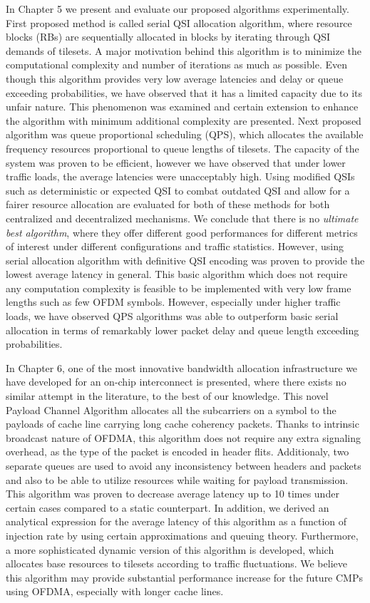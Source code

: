 In Chapter 5 we present and evaluate our proposed algorithms experimentally. First proposed method is called serial QSI allocation algorithm, where resource blocks (RBs) are sequentially allocated in blocks by iterating through QSI demands of tilesets. A major motivation behind this algorithm is to minimize the computational complexity and number of iterations as much as possible. Even though this algorithm provides very low average latencies and delay or queue exceeding probabilities, we have observed that it has a limited capacity due to its unfair nature. This phenomenon was examined and certain extension to enhance the algorithm with minimum additional complexity are presented. Next proposed algorithm was queue proportional scheduling (QPS), which allocates the available frequency resources proportional to queue lengths of tilesets. The capacity of the system was proven to be efficient, however we have observed that under lower traffic loads, the average latencies were unacceptably high. Using modified QSIs such as deterministic or expected QSI to combat outdated QSI and allow for a fairer resource allocation are evaluated for both of these methods for both centralized and decentralized mechanisms. We conclude that there is no \textit{ultimate best algorithm}, where they offer different good performances for different metrics of interest under different configurations and traffic statistics. However, using serial allocation algorithm with definitive QSI encoding was proven to provide the lowest average latency in general. This basic algorithm which does not require any computation complexity is feasible to be implemented with very low frame lengths such as few OFDM symbols. However, especially under higher traffic loads, we have observed QPS algorithms was able to outperform basic serial allocation in terms of remarkably lower packet delay and queue length exceeding probabilities. 
 
In Chapter 6, one of the most innovative bandwidth allocation infrastructure we have developed for an on-chip interconnect is presented, where there exists no similar attempt in the literature, to the best of our knowledge. This novel Payload Channel Algorithm allocates all the subcarriers on a symbol to the payloads of cache line carrying long cache coherency packets. Thanks to intrinsic broadcast nature of OFDMA, this algorithm does not require any extra signaling overhead, as the type of the packet is encoded in header flits. Additionaly, two separate queues are used to avoid any inconsistency between headers and packets and also to be able to utilize resources while waiting for payload transmission. This algorithm was proven to decrease average latency up to 10 times under certain cases compared to a static counterpart. In addition, we derived an analytical expression for the average latency of this algorithm as a function of injection rate by using certain approximations and queuing theory. Furthermore, a more sophisticated dynamic version of this algorithm is developed, which allocates base resources to tilesets according to traffic fluctuations. We believe this algorithm may provide substantial performance increase for the future CMPs using OFDMA, especially with longer cache lines.


